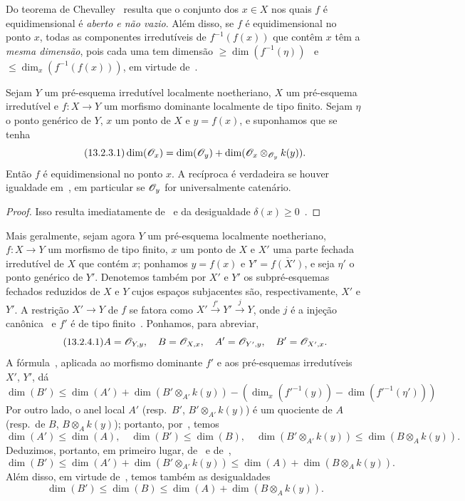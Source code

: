 Do teorema de Chevalley~ resulta que o conjunto dos
$x\in X$ nos quais $f$ é equidimensional é \emph{aberto e não vazio}.
Além disso, se $f$ é equidimensional no ponto $x$, todas as componentes
irredutíveis de $f^{-1}(f(x))$ que contêm $x$ têm a \emph{mesma dimensão},
pois cada uma tem dimensão $\geq\dim(f^{-1}(\eta))$~
e $\leq\dim_x(f^{-1}(f(x)))$, em virtude de~.

\begin{proposition}[13.2.3]
\label{IV.13.2.3}
Sejam $Y$ um pré-esquema irredutível localmente noetheriano,
$X$ um pré-esquema irredutível e $f:X\to Y$ um morfismo dominante
localmente de tipo finito.
Sejam $\eta$ o ponto genérico de $Y$, $x$ um ponto de $X$ e $y=f(x)$,
e suponhamos que se tenha
\[
\label{IV.13.2.3.1}
\tag{13.2.3.1}
  \dim(\sh{O}_x)=\dim(\sh{O}_y)+\dim(\sh{O}_x\otimes_{\sh{O}_y}k(y)).
\]
Então $f$ é equidimensional no ponto $x$.
A recíproca é verdadeira se houver igualdade em~,
em particular se $\mathscr{O}_y$ for universalmente catenário.
\end{proposition}

\begin{proof}
Isso resulta imediatamente de~
e da desigualdade $\delta(x)\geq 0$~.
\end{proof}

\begin{env}[13.2.4]
\label{IV.13.2.4}
Mais geralmente, sejam agora $Y$ um pré-esquema localmente noetheriano,
$f:X\to Y$ um morfismo de tipo finito, $x$ um ponto de $X$
e $X'$ uma parte fechada irredutível de $X$ que contém $x$;
ponhamos $y=f(x)$ e $Y'=\overline{f(X')}$,
e seja $\eta'$ o ponto genérico de $Y'$.
Denotemos também por $X'$ e $Y'$ os subpré-esquemas fechados reduzidos
de $X$ e $Y$ cujos espaços subjacentes são, respectivamente, $X'$ e $Y'$.
A restrição $X'\to Y$ de $f$ se fatora como
$X'\xrightarrow{f'}Y'\xrightarrow{j}Y$,
onde $j$ é a injeção canônica~
e $f'$ é de tipo finito~.
Ponhamos, para abreviar,
\[
\label{IV.13.2.4.1}
\tag{13.2.4.1}
  A=\sh{O}_{Y,y},\quad B=\sh{O}_{X,x},\quad A'=\sh{O}_{Y',y},\quad B'=\sh{O}_{X',x}.
\]
A fórmula~, aplicada ao morfismo dominante $f'$
e aos pré-esquemas irredutíveis $X'$, $Y'$, dá
\[
\label{IV.13.2.4.2}
\tag{13.2.4.2}
  \dim(B')\leq\dim(A')+\dim(B'\otimes_{A'}k(y))-(\dim_x(f'^{-1}(y))-\dim(f'^{-1}(\eta')))
\]
Por outro lado, o anel local $A'$ (resp.\ $B'$, $B'\otimes_{A'}k(y)$)
é um quociente de $A$ (resp.\ de $B$, $B\otimes_A k(y)$);
portanto, por~, temos
\[
\tag{13.2.4.3}
\label{IV.13.2.4.3}
  \dim(A')\leq\dim(A),\quad \dim(B')\leq\dim(B),\quad \dim(B'\otimes_{A'}k(y))\leq\dim(B\otimes_A k(y)).
\]
Deduzimos, portanto, em primeiro lugar, de~
e de~,
\[
\label{IV.13.2.4.4}
\tag{13.2.4.4}
  \dim(B')\leq\dim(A')+\dim(B'\otimes_{A'}k(y))\leq\dim(A)+\dim(B\otimes_A k(y)).
\]
Além disso, em virtude de~,
temos também as desigualdades
\[
\label{IV.13.2.4.5}
\tag{13.2.4.5}
  \dim(B')\leq\dim(B)\leq\dim(A)+\dim(B\otimes_A k(y)).
\]
\end{env}

